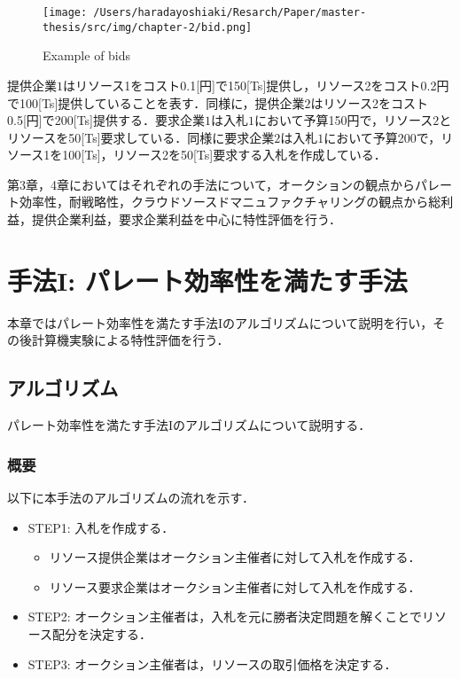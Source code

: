 \begin{figure}[H]
\hypertarget{fig:example-bid}{%
\centering
\texttt{[image: /Users/haradayoshiaki/Resarch/Paper/master-thesis/src/img/chapter-2/bid.png]}
\caption{Example of bids}\label{fig:example-bid}
}
\end{figure}

提供企業\(1\)はリソース1をコスト0.1{[}円{]}で150{[}Ts{]}提供し，リソース2をコスト0.2円で100{[}Ts{]}提供していることを表す．同様に，提供企業\(2\)はリソース2をコスト0.5{[}円{]}で200{[}Ts{]}提供する．要求企業\(1\)は入札\(1\)において予算150円で，リソース\(2\)とリソースを50{[}Ts{]}要求している．同様に要求企業\(2\)は入札\(1\)において予算200で，リソース1を100{[}Ts{]}，リソース2を50{[}Ts{]}要求する入札を作成している．

第3章，4章においてはそれぞれの手法について，オークションの観点からパレート効率性，耐戦略性，クラウドソースドマニュファクチャリングの観点から総利益，提供企業利益，要求企業利益を中心に特性評価を行う．

\hypertarget{ux624bux6cd5i-ux30d1ux30ecux30fcux30c8ux52b9ux7387ux6027ux3092ux6e80ux305fux3059ux624bux6cd5}{%
\chapter{手法I:
パレート効率性を満たす手法}\label{ux624bux6cd5i-ux30d1ux30ecux30fcux30c8ux52b9ux7387ux6027ux3092ux6e80ux305fux3059ux624bux6cd5}}

本章ではパレート効率性を満たす手法Iのアルゴリズムについて説明を行い，その後計算機実験による特性評価を行う．

\hypertarget{ux30a2ux30ebux30b4ux30eaux30baux30e0}{%
\section{アルゴリズム}\label{ux30a2ux30ebux30b4ux30eaux30baux30e0}}

パレート効率性を満たす手法Iのアルゴリズムについて説明する．

\hypertarget{ux6982ux8981}{%
\subsection{概要}\label{ux6982ux8981}}

以下に本手法のアルゴリズムの流れを示す．

\begin{itemize}
\tightlist
\item
  STEP1: 入札を作成する．

  \begin{itemize}
  \tightlist
  \item
    リソース提供企業はオークション主催者に対して入札を作成する．
  \item
    リソース要求企業はオークション主催者に対して入札を作成する．
  \end{itemize}
\item
  STEP2:
  オークション主催者は，入札を元に勝者決定問題を解くことでリソース配分を決定する．
\item
  STEP3: オークション主催者は，リソースの取引価格を決定する．
\end{itemize}

